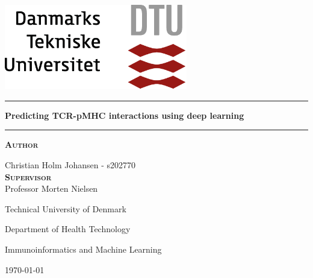 
\begin{titlepage}
\begin{center}
\vspace{2cm}
\includegraphics[width=0.6\textwidth]{root/dtu.png}~\\[1cm]
\vspace{2cm}

\vspace{2cm}

\hrule
\vspace{.5cm}
{ \huge \bfseries Predicting TCR-pMHC interactions using deep learning} %
\vspace{.5cm}

\hrule
\vspace{1.5cm}

\textsc{\textbf{Author}}\\
\vspace{.2cm}
\centering

Christian Holm Johansen  - s202770\\
\vspace{.2cm}
\textsc{\textbf{Supervisor}}\\
\vspace{.2cm}
Professor Morten Nielsen

\vspace{.5cm}
Technical University of Denmark

Department of Health Technology

Immunoinformatics and Machine Learning

\centering \today %

\end{center}
\end{titlepage}